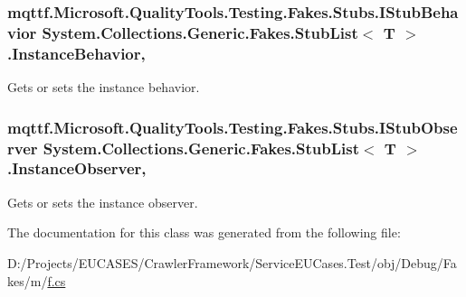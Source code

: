 \hypertarget{class_system_1_1_collections_1_1_generic_1_1_fakes_1_1_stub_list_3_01_t_01_4_a4e21ab3f61795e9d5bf22079fd4341fd}{
\subsubsection[{Instance\-Behavior}]{\setlength{\rightskip}{0pt plus 5cm}mqttf.\-Microsoft.\-Quality\-Tools.\-Testing.\-Fakes.\-Stubs.\-I\-Stub\-Behavior System.\-Collections.\-Generic.\-Fakes.\-Stub\-List$<$ T $>$.Instance\-Behavior\hspace{0.3cm}{\ttfamily [get]}, {\ttfamily [set]}}}\label{class_system_1_1_collections_1_1_generic_1_1_fakes_1_1_stub_list_3_01_t_01_4_a4e21ab3f61795e9d5bf22079fd4341fd}


Gets or sets the instance behavior.

\hypertarget{class_system_1_1_collections_1_1_generic_1_1_fakes_1_1_stub_list_3_01_t_01_4_a89666d8079bd941265ad772ae07c9945}{
\subsubsection[{Instance\-Observer}]{\setlength{\rightskip}{0pt plus 5cm}mqttf.\-Microsoft.\-Quality\-Tools.\-Testing.\-Fakes.\-Stubs.\-I\-Stub\-Observer System.\-Collections.\-Generic.\-Fakes.\-Stub\-List$<$ T $>$.Instance\-Observer\hspace{0.3cm}{\ttfamily [get]}, {\ttfamily [set]}}}\label{class_system_1_1_collections_1_1_generic_1_1_fakes_1_1_stub_list_3_01_t_01_4_a89666d8079bd941265ad772ae07c9945}


Gets or sets the instance observer.



The documentation for this class was generated from the following file\-:\begin{DoxyCompactItemize}
\item 
D\-:/\-Projects/\-E\-U\-C\-A\-S\-E\-S/\-Crawler\-Framework/\-Service\-E\-U\-Cases.\-Test/obj/\-Debug/\-Fakes/m/\hyperlink{m_2f_8cs}{f.\-cs}\end{DoxyCompactItemize}
